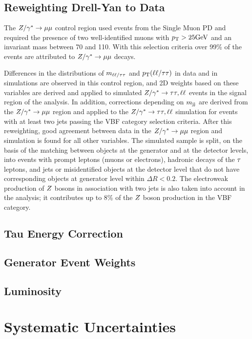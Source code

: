 \subsection{Reweighting Drell-Yan to Data}

The $Z/\gamma^*\to\mu\mu$ control region used events
from the Single Muon PD and required the presence of two well-identified
muons with $p_\mathrm{T} > 25 \mathrm{GeV}$ and an invariant mass between 70 and 110\GeV.
With this selection criteria over 99\% of the events are attributed to
$Z/\gamma^*\to\mu\mu$ decays.


Differences in the distributions of $m_{\ell\ell/\tau\tau}$ and $p_\mathrm{T}(\ell\ell/\tau\tau)$ in data and in simulations are observed in this control region, and 2D weights based on these variables are derived and applied to simulated $Z/\gamma^*\to\tau\tau, \ell\ell$ events in the signal region of the analysis. 
In addition, corrections depending on $m_\mathrm{jj}$ are derived from the $Z/\gamma^*\to\mu\mu$ region and applied to the $Z/\gamma^*\to\tau\tau, \ell\ell$ simulation for events with at least two jets passing the VBF category selection criteria. After this reweighting, good agreement between data in the $Z/\gamma^*\to\mu\mu$ region and simulation is found for all other variables.
The simulated sample is split, on the basis of the matching between objects at the generator and at the detector levels,
into events with prompt leptons (muons or electrons), hadronic decays of the $\tau$ leptons,
and jets or misidentified objects at the detector level that do not have corresponding objects
at generator level within $\Delta R < 0.2$.
The electroweak production of $Z$ bosons in association with two jets is also taken into account in the analysis; it
contributes up to 8\% of the $Z$ boson production in the VBF category.
\subsection{Tau Energy Correction}
\subsection{Generator Event Weights}
\subsection{Luminosity}

\pagebreak

\section{Systematic Uncertainties}

